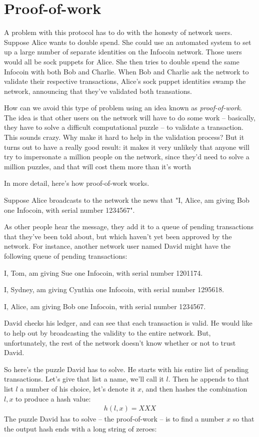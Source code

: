 \documentclass[12pt]{book}
\newcounter{problem}[chapter]
\begin{document}
\section{Proof-of-work}

A problem with this protocol has to do with the honesty of network
users.  Suppose Alice wants to double spend.  She could use an
automated system to set up a large number of separate identities on
the Infocoin network.  Those users would all be sock puppets for
Alice.  She then tries to double spend the same Infocoin with both Bob
and Charlie.  When Bob and Charlie ask the network to validate their
respective transactions, Alice's sock puppet identities swamp the
network, announcing that they've validated both transations.

How can we avoid this type of problem using an idea known as
\emph{proof-of-work}.  The idea is that other users on the network
will have to do some work -- basically, they have to solve a difficult
computational puzzle -- to validate a transaction.  This sounds crazy.
Why make it hard to help in the validation process?  But it turns out
to have a really good result: it makes it very unlikely that anyone
will try to impersonate a million people on the network, since they'd
need to solve a million puzzles, and that will cost them more than
it's worth

In more detail, here's how proof-of-work works.

Suppose Alice broadcasts to the network the news that "I, Alice, am
giving Bob one Infocoin, with serial number 1234567".  

As other people hear the message, they add it to a queue of pending
transactions that they've been told about, but which haven't yet been
approved by the network.  For instance, another network user named
David might have the following queue of pending transactions:

I, Tom, am giving Sue one Infocoin, with serial number 1201174.

I, Sydney, am giving Cynthia one Infocoin, with serial number 1295618.

I, Alice, am giving Bob one Infocoin, with serial number 1234567.

David checks his ledger, and can see that each transaction is valid.
He would like to help out by broadcasting the validity to the entire
network.  But, unfortunately, the rest of the network doesn't know
whether or not to trust David.

So here's the puzzle David has to solve.  He starts with his entire
list of pending transactions.  Let's give that list a name, we'll call
it $l$.  Then he appends to that list $l$ a number of his choice,
let's denote it $x$, and then hashes the combination $l, x$ to produce
a hash value:
\begin{eqnarray}
h(l, x) = XXX
\end{eqnarray}
The puzzle David has to solve -- the proof-of-work -- is to find a
number $x$ so that the output hash ends with a long string of zeroes:
\end{document}
